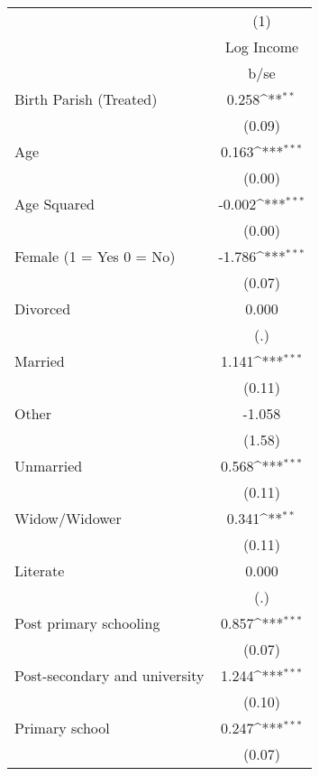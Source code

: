 {
\def\sym#1{\ifmmode^{#1}\else\(^{#1}\)\fi}
\begin{tabular}{l*{1}{c}}
\hline\hline
                    &\multicolumn{1}{c}{(1)}\\
                    &\multicolumn{1}{c}{Log Income}\\
                    &        b/se         \\
\hline
Birth Parish (Treated)&       0.258\sym{**} \\
                    &      (0.09)         \\
Age                 &       0.163\sym{***}\\
                    &      (0.00)         \\
Age Squared         &      -0.002\sym{***}\\
                    &      (0.00)         \\
Female (1 = Yes 0 = No)&      -1.786\sym{***}\\
                    &      (0.07)         \\
Divorced            &       0.000         \\
                    &         (.)         \\
Married             &       1.141\sym{***}\\
                    &      (0.11)         \\
Other               &      -1.058         \\
                    &      (1.58)         \\
Unmarried           &       0.568\sym{***}\\
                    &      (0.11)         \\
Widow/Widower       &       0.341\sym{**} \\
                    &      (0.11)         \\
Literate            &       0.000         \\
                    &         (.)         \\
Post primary schooling&       0.857\sym{***}\\
                    &      (0.07)         \\
Post-secondary and university&       1.244\sym{***}\\
                    &      (0.10)         \\
Primary school      &       0.247\sym{***}\\
                    &      (0.07)         \\

\end{tabular}}
